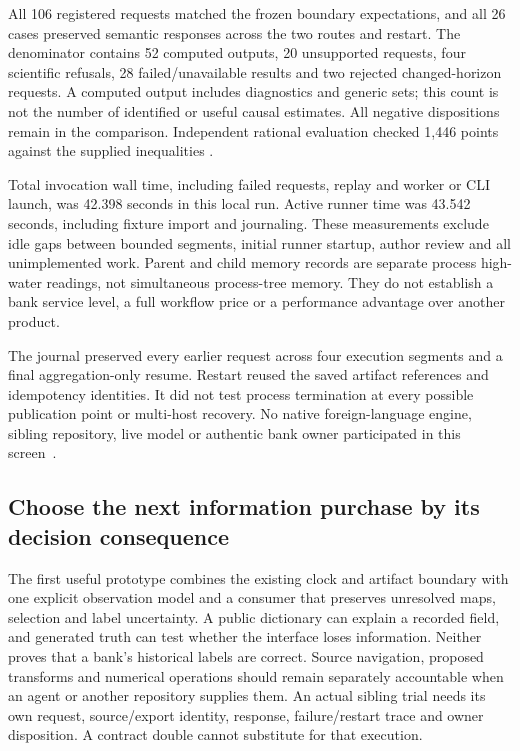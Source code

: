 All 106 registered requests matched the frozen boundary expectations, and
all 26 cases preserved semantic responses across the two routes and restart.
The denominator contains 52 computed outputs, 20 unsupported requests,
four scientific refusals, 28 failed/unavailable results and two rejected
changed-horizon requests. A computed output includes diagnostics and generic
sets; this count is not the number of identified or useful causal estimates.
All negative dispositions remain in the comparison. Independent rational
evaluation checked 1,446 points against the supplied inequalities
\citep{exec13_observation_run}.

Total invocation wall time, including failed requests, replay and worker or
CLI launch, was 42.398 seconds in this local run. Active runner
time was 43.542 seconds, including fixture import and journaling.
These measurements exclude idle gaps between bounded segments, initial
runner startup, author review and all unimplemented work. Parent and child
memory records are separate process high-water readings, not simultaneous
process-tree memory. They do not establish a bank service level, a full
workflow price or a performance advantage over another product.

The journal preserved every earlier request across four execution segments
and a final aggregation-only resume. Restart reused the saved artifact
references and idempotency identities. It did not test process termination
at every possible publication point or multi-host recovery. No native
foreign-language engine, sibling repository, live model or authentic bank
owner participated in this screen~\citep{exec13_observation_run}.




\subsection{Choose the next information purchase by its decision consequence}

The first useful prototype combines the existing clock and artifact boundary
with one explicit observation model and a consumer that preserves unresolved
maps, selection and label uncertainty. A public dictionary can explain a
recorded field, and generated truth can test whether the interface loses
information. Neither proves that a bank's historical labels are correct.
Source navigation, proposed transforms and numerical operations should remain
separately accountable when an agent or another repository supplies them.
An actual sibling trial needs its own request, source/export identity,
response, failure/restart trace and owner disposition. A contract double
cannot substitute for that execution.

